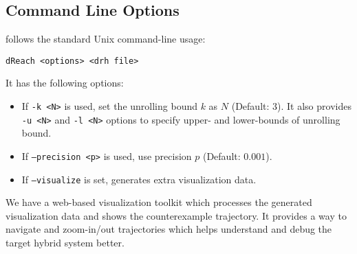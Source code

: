 \subsection{Command Line Options}
\dReach{} follows the standard Unix command-line usage:
\begin{Verbatim}[fontfamily=courier, framesep=1mm, fontsize=\small]
dReach <options> <drh file>
\end{Verbatim}
It has the following options:
\begin{itemize}
\item If \texttt{-k <N>} is used, set the unrolling bound $k$ as $N$
  (Default: 3). It also provides \texttt{-u <N>} and \texttt{-l <N>}
  options to specify upper- and lower-bounds of unrolling bound.
\item If \texttt{--precision <p>} is used, use precision $p$ (Default: $0.001$).
\item If \texttt{--visualize} is set, \dReach{} generates extra visualization data.
\end{itemize}
We have a web-based visualization toolkit which processes the
generated visualization data and shows the counterexample
trajectory. It provides a way to navigate and zoom-in/out trajectories
which helps understand and debug the target hybrid system better.

